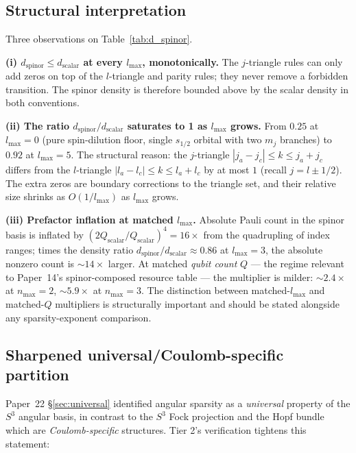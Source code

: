 \documentclass[twocolumn,pra,amsmath,amssymb,superscriptaddress]{revtex4-2}
\begin{document}
\subsection{Structural interpretation}

Three observations on Table~\ref{tab:d_spinor}.

\textbf{(i) $d_{\mathrm{spinor}} \leq d_{\mathrm{scalar}}$ at every $l_{\max}$, monotonically.}
The $j$-triangle rules can only add zeros on top of the $l$-triangle
and parity rules; they never remove a forbidden transition. The
spinor density is therefore bounded above by the scalar density in
both conventions.

\textbf{(ii) The ratio $d_{\mathrm{spinor}}/d_{\mathrm{scalar}}$ saturates to 1 as $l_{\max}$ grows.}
From $0.25$ at $l_{\max}=0$ (pure spin-dilution floor, single
$s_{1/2}$ orbital with two $m_j$ branches) to $0.92$ at $l_{\max}=5$.
The structural reason: the $j$-triangle
$|j_a - j_c| \leq k \leq j_a + j_c$ differs from the $l$-triangle
$|l_a - l_c| \leq k \leq l_a + l_c$ by at most $1$ (recall
$j = l \pm 1/2$). The extra zeros are boundary corrections to the
triangle set, and their relative size shrinks as $O(1/l_{\max})$ as
$l_{\max}$ grows.

\textbf{(iii) Prefactor inflation at matched $l_{\max}$.}
Absolute Pauli count in the spinor basis is inflated by
$(2Q_{\mathrm{scalar}}/Q_{\mathrm{scalar}})^4 = 16\times$ from the
quadrupling of index ranges; times the density ratio
$d_{\mathrm{spinor}}/d_{\mathrm{scalar}} \approx 0.86$ at $l_{\max}=3$,
the absolute nonzero count is $\sim 14\times$ larger. At matched
\emph{qubit count} $Q$ --- the regime relevant to
Paper~14's spinor-composed
resource table --- the multiplier is milder:
$\sim 2.4\times$ at $n_{\max}=2$, $\sim 5.9\times$ at $n_{\max}=3$.
The distinction between matched-$l_{\max}$ and matched-$Q$
multipliers is structurally important and should be stated
alongside any sparsity-exponent comparison.

\subsection{Sharpened universal/Coulomb-specific partition}

Paper~22 \S\ref{sec:universal} identified angular sparsity
as a \emph{universal} property of the $S^3$ angular basis, in contrast
to the $S^3$ Fock projection and the Hopf bundle which are
\emph{Coulomb-specific} structures. Tier 2's verification tightens
this statement:
\end{document}
